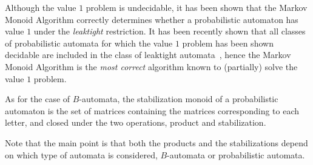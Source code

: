 Although the value $1$ problem is undecidable, it has been shown that
the Markov Monoid Algorithm correctly determines whether a probabilistic automaton has value $1$
under the \textit{leaktight} restriction.
It has been recently shown that all classes of probabilistic automata for which the value $1$ problem has been shown decidable 
are included in the class of leaktight automata~\cite{FGKO14},
hence the Markov Monoid Algorithm is the \textit{most correct} algorithm known to (partially) solve the value $1$ problem.

As for the case of $B$-automata, the stabilization monoid of a probabilistic automaton
is the set of matrices containing the matrices corresponding to each letter,
and closed under the two operations, product and stabilization.

Note that the main point is that both the products and the stabilizations depend on which type of automata is considered,
$B$-automata or probabilistic automata.